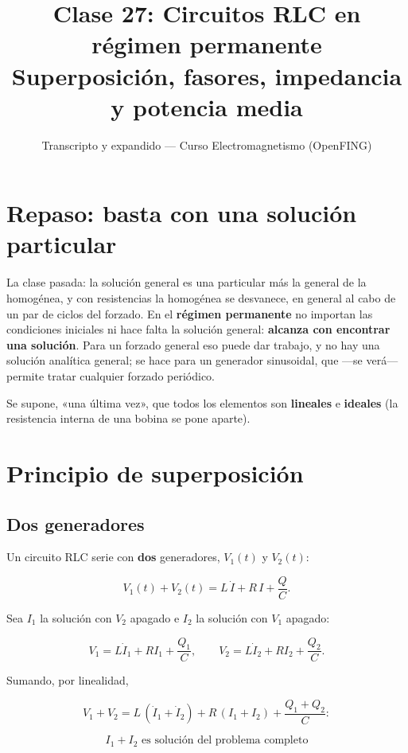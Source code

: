 \documentclass[12pt,a4paper]{article}
\title{\textbf{Clase 27: Circuitos RLC en régimen permanente} \\[0.3em]
        \large{Superposición, fasores, impedancia y potencia media}}
\author{Transcripto y expandido --- Curso Electromagnetismo (OpenFING)}
\date{}
\begin{document}
\maketitle
\thispagestyle{empty}
\newpage

\tableofcontents
\newpage

\section{Repaso: basta con una solución particular}

La clase pasada: la solución general es una particular más la general de la
homogénea, y con resistencias la homogénea se desvanece, en general al cabo de
un par de ciclos del forzado. En el \textbf{régimen permanente} no importan las
condiciones iniciales ni hace falta la solución general: \textbf{alcanza con
encontrar una solución}. Para un forzado general eso puede dar trabajo, y no
hay una solución analítica general; se hace para un generador sinusoidal, que
---se verá--- permite tratar cualquier forzado periódico.

Se supone, «una última vez», que todos los elementos son \textbf{lineales} e
\textbf{ideales} (la resistencia interna de una bobina se pone aparte).

\section{Principio de superposición}

\subsection{Dos generadores}

Un circuito RLC serie con \textbf{dos} generadores, $V_1(t)$ y $V_2(t)$:

\[
V_1(t) + V_2(t) = L\,\dot I + R\,I + \frac{Q}{C}.
\]

Sea $I_1$ la solución con $V_2$ apagado e $I_2$ la solución con $V_1$
apagado:

\[
V_1 = L\dot I_1 + R I_1 + \frac{Q_1}{C},
\qquad
V_2 = L\dot I_2 + R I_2 + \frac{Q_2}{C}.
\]

Sumando, por linealidad,

\[
V_1 + V_2 = L\,(\dot I_1+\dot I_2) + R\,(I_1+I_2) + \frac{Q_1+Q_2}{C}:
\]

\begin{keybox}
\[
\boxed{\ I_1 + I_2 \text{ es solución del problema completo}\ }
\]
\end{keybox}
\end{document}
